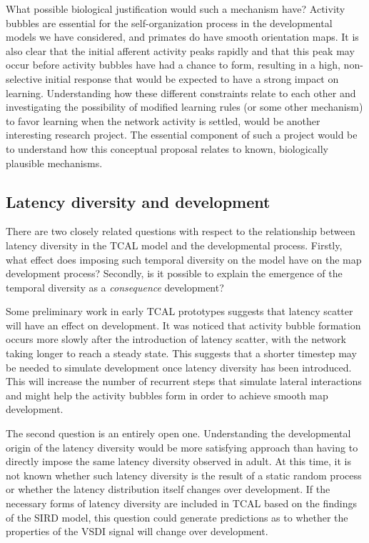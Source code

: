\documentclass[phd,ianc,twoside]{infthesis}
\begin{document}
What possible biological justification would such a mechanism have?
Activity bubbles are essential for the self-organization process in the
developmental models we have considered, and primates do have smooth
orientation maps. It is also clear that the initial afferent activity
peaks rapidly and that this peak may occur before activity bubbles have
had a chance to form, resulting in a high, non-selective initial response that
would be expected to have a strong impact on learning. Understanding
how these different constraints relate to 
each other and investigating the possibility of modified learning rules
(or some other mechanism) to favor learning when the network activity
is settled, would be another interesting research project. The essential
component of such a project would be to understand how this conceptual
proposal relates to known, biologically plausible mechanisms.


\subsection{Latency diversity and development}
\label{section:future_TCAL_temporal_diversity}

There are two closely related questions with respect to the
relationship between latency diversity in the TCAL model and the
developmental process. Firstly, what effect does imposing such temporal diversity
on the model have on the map development process?  Secondly, is it possible to
explain the emergence of the temporal diversity as a \emph{consequence}
development?

Some preliminary work in early TCAL prototypes suggests that  latency scatter will have an effect on development. It was noticed
that activity bubble formation occurs more slowly after the
introduction of latency scatter, with the network taking longer to reach
a steady state. This suggests that a shorter timestep may be needed to
simulate development once latency diversity has been introduced. This
will increase the number of recurrent steps that simulate lateral interactions and might help
the activity bubbles form in order to achieve smooth map development.

The second question is an entirely open one. Understanding the
developmental origin of the latency diversity would be more satisfying
approach than having to directly impose the same latency diversity observed
in adult. At this time, it is not known whether such latency diversity
is the result of a static random process or whether the latency
distribution itself changes over development. If the necessary
forms of latency diversity are included in TCAL based on the findings of the SIRD model, this question could generate predictions
as to whether the properties of the VSDI signal will change over development.
\end{document}

